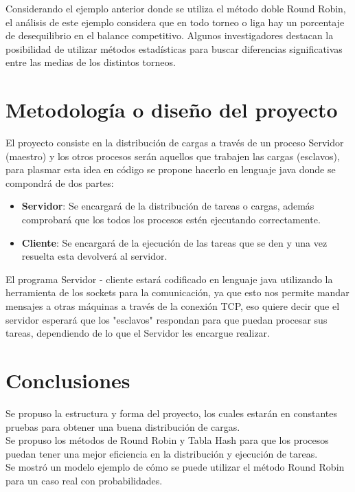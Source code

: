 \documentclass[conference,letterpaper]{IEEEtran}
\begin{document}
Considerando el ejemplo anterior donde se utiliza el método doble Round Robin, el análisis de este ejemplo considera que en todo torneo o liga hay un porcentaje de desequilibrio en el balance competitivo. Algunos investigadores destacan la posibilidad de utilizar métodos estadísticas para buscar diferencias significativas entre las medias de los distintos torneos.

\section{Metodolog\'ia o diseño del proyecto}
El proyecto consiste en la distribución de cargas a través de un proceso Servidor (maestro) y los otros procesos serán aquellos que  trabajen las cargas (esclavos), para plasmar esta idea en código se propone hacerlo en lenguaje java donde se compondrá de dos partes:

\begin{itemize}
    \item \textbf{Servidor}: Se encargará de la distribución de tareas o cargas, además comprobará que los todos los procesos estén ejecutando correctamente.
    \item \textbf{Cliente}: Se encargará de la ejecución de las tareas que se den y una vez resuelta esta devolverá al servidor.
\end{itemize}

El programa Servidor - cliente estará codificado en lenguaje java utilizando la herramienta de los sockets para la comunicación, ya que esto nos permite mandar mensajes a otras máquinas a través de la conexión TCP, eso quiere decir que el servidor esperará que los "esclavos" respondan para que puedan procesar sus tareas, dependiendo de lo que el Servidor les encargue realizar.\\

\section{Conclusiones}
Se propuso la estructura y forma del proyecto, los cuales estarán en constantes pruebas para obtener una buena distribución de cargas.\\

Se propuso los métodos de Round Robin y Tabla Hash para que los procesos puedan tener una mejor eficiencia en la distribución y ejecución de tareas.\\

Se mostró un modelo ejemplo de cómo se puede utilizar el método Round Robin para un caso real con probabilidades.
\end{document}
